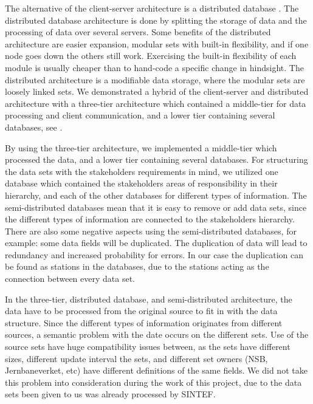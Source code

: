 The alternative of the client-server architecture is a distributed
database \cite[pp. 301-303]{toftHanseMallaugDatabaser}. The distributed database
architecture is done by splitting the storage of data and the processing of
data over several servers. Some benefits of the distributed architecture are 
easier expansion, modular sets with built-in flexibility, and if one node 
goes down the others still work. Exercising the built-in flexibility of each
module is usually cheaper than to hand-code a specific change in hindsight\cite[pp. 117-130]{Bass:2012:SAP:2392670}. The distributed architecture is a 
modifiable data storage, where the modular sets are loosely linked sets. 
We demonstrated a hybrid of the client-server and distributed
architecture \cite[pp. 297-299]{toftHanseMallaugDatabaser} with a three-tier
architecture which contained a middle-tier for data processing and client
communication, and a lower tier containing several databases, see
.

By using the three-tier architecture, we implemented a middle-tier which 
processed the data, and a lower tier containing several databases. For
structuring the data sets with the stakeholders requirements in mind, we
utilized one database which contained the stakeholders areas of responsibility in
their hierarchy, and each of the other databases for different types of 
information. The semi-distributed databases mean that it is easy to remove or
add data sets, since the different types of information are connected to the
stakeholders hierarchy. There are also some negative aspects using
the semi-distributed databases, for example: some data fields
will be duplicated. The duplication of data will lead to redundancy and
increased probability for errors. In our case the duplication can be found as stations in the databases, due to the stations acting as the
connection between every data set. 

In the three-tier, distributed database, 
and semi-distributed architecture, the data have to be processed from the 
original source to fit in with the data structure. Since the different types of
information originates from different sources, a semantic problem with the date
occurs on the different sets. Use of the source sets have huge compatibility 
issues between, as the sets have different sizes, different update interval
the sets, and different set owners (NSB, Jernbaneverket, etc) have different
definitions of the same fields. We did not take this problem into consideration
during the work of this project, due to the data sets been given to us was 
already processed by SINTEF. 

